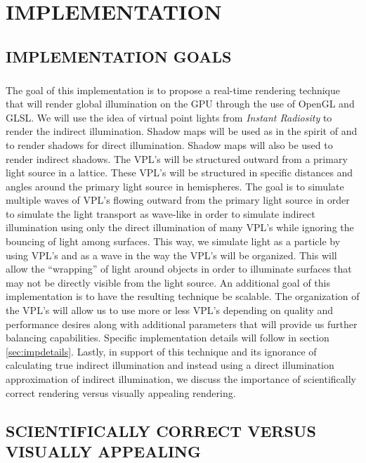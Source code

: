 \chapter{IMPLEMENTATION}

\section{IMPLEMENTATION GOALS} \label{sec:impgoals}
\paragraph{}
The goal of this implementation is to propose a real-time rendering technique that will render global illumination on the GPU through the use of OpenGL and GLSL.  We will use the idea of virtual point lights from \textit{Instant Radiosity} \cite{Keller1997} to render the indirect illumination.  Shadow maps will be used as in the spirit of \cite{Williams1978} and \cite{Reeves1987} to render shadows for direct illumination.  Shadow maps will also be used to render indirect shadows.  The VPL's will be structured outward from a primary light source in a lattice.  These VPL's will be structured in specific distances and angles around the primary light source in hemispheres. The goal is to simulate multiple waves of VPL's flowing outward from the primary light source in order to simulate the light transport as wave-like in order to simulate indirect illumination using only the direct illumination of many VPL's while ignoring the bouncing of light among surfaces.  This way, we simulate light as a particle by using VPL's and as a wave in the way the VPL's will be organized.  This will allow the ``wrapping'' of light around objects in order to illuminate surfaces that may not be directly visible from the light source.  An additional goal of this implementation is to have the resulting technique be scalable.  The organization of the VPL's will allow us to use more or less VPL's depending on quality and performance desires along with additional parameters that will provide us further balancing capabilities.  Specific implementation details will follow in section \ref{sec:impdetails}.  Lastly, in support of this technique and its ignorance of calculating true indirect illumination and instead using a direct illumination approximation of indirect illumination, we discuss the importance of scientifically correct rendering versus visually appealing rendering.

\section{SCIENTIFICALLY CORRECT VERSUS VISUALLY APPEALING} \label{sec:study}
